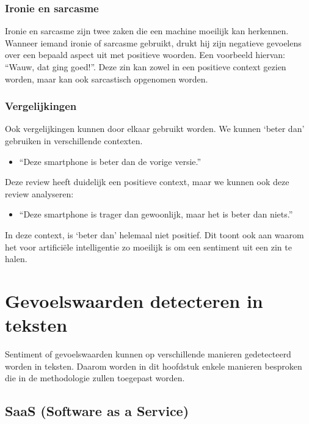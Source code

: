 \subsubsection{Ironie en sarcasme}
\label{ironiesarcasme}

Ironie en sarcasme zijn twee zaken die een machine moeilijk kan herkennen. Wanneer iemand ironie of sarcasme gebruikt, drukt hij zijn negatieve gevoelens over een bepaald aspect uit met positieve woorden. \autocite{MonkeyLearn2021} Een voorbeeld hiervan: “Wauw, dat ging goed!”. Deze zin kan zowel in een positieve context gezien worden, maar kan ook sarcastisch opgenomen worden. 

\subsubsection{Vergelijkingen}
\label{vergelijkingen}

Ook vergelijkingen kunnen door elkaar gebruikt worden. We kunnen ‘beter dan’ gebruiken in verschillende contexten. 

\begin{itemize}
    \item “Deze smartphone is beter dan de vorige versie.”
\end{itemize}

Deze review heeft duidelijk een positieve context, maar we kunnen ook deze review analyseren:


\begin{itemize}
    \item “Deze smartphone is trager dan gewoonlijk, maar het is beter dan niets.”
\end{itemize}

In deze context, is ‘beter dan’ helemaal niet positief. Dit toont ook aan waarom het voor artificiële intelligentie zo moeilijk is om een sentiment uit een zin te halen. 


\section{Gevoelswaarden detecteren in teksten}
\label{gevoelswaardendetecteren}

Sentiment of gevoelswaarden kunnen op verschillende manieren gedetecteerd worden in teksten. Daarom worden in dit hoofdstuk enkele manieren besproken die in de methodologie zullen toegepast worden. 

\subsection{SaaS (Software as a Service)}
\label{saas}

